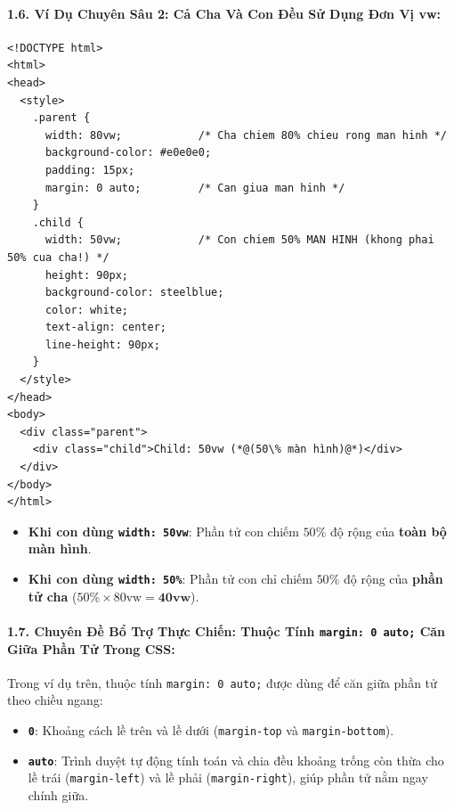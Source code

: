 \documentclass[11pt,oneside]{book}
\newcommand{\codeinline}[1]{\textcolor{accentOrange}{\texttt{#1}}}
\begin{document}
\paragraph{1.6. Ví Dụ Chuyên Sâu 2: Cả Cha Và Con Đều Sử Dụng Đơn Vị vw:}

\begin{codeWindow}
\begin{lstlisting}[language=HTML5]
<!DOCTYPE html>
<html>
<head>
  <style>
    .parent {
      width: 80vw;            /* Cha chiem 80% chieu rong man hinh */
      background-color: #e0e0e0;
      padding: 15px;
      margin: 0 auto;         /* Can giua man hinh */
    }
    .child {
      width: 50vw;            /* Con chiem 50% MAN HINH (khong phai 50% cua cha!) */
      height: 90px;
      background-color: steelblue;
      color: white;
      text-align: center;
      line-height: 90px;
    }
  </style>
</head>
<body>
  <div class="parent">
    <div class="child">Child: 50vw (*@(50\% màn hình)@*)</div>
  </div>
</body>
</html>
\end{lstlisting}
\end{codeWindow}

\begin{conceptBox}
\begin{itemize}[leftmargin=1.5em, itemsep=3pt, parsep=0pt]
    \item \textbf{Khi con dùng \codeinline{width: 50vw}}: Phần tử con chiếm $50\%$ độ rộng của \textbf{toàn bộ màn hình}.
    \item \textbf{Khi con dùng \codeinline{width: 50\%}}: Phần tử con chỉ chiếm $50\%$ độ rộng của \textbf{phần tử cha} ($50\% \times 80\text{vw} = \mathbf{40\text{vw}}$).
\end{itemize}
\end{conceptBox}

\paragraph{1.7. Chuyên Đề Bổ Trợ Thực Chiến: Thuộc Tính \codeinline{margin: 0 auto;} Căn Giữa Phần Tử Trong CSS:}

Trong ví dụ trên, thuộc tính \codeinline{margin: 0 auto;} được dùng để căn giữa phần tử theo chiều ngang:

\begin{conceptBox}
\begin{itemize}[leftmargin=1.5em, itemsep=2pt, parsep=0pt]
    \item \textbf{\codeinline{0}}: Khoảng cách lề trên và lề dưới (\codeinline{margin-top} và \codeinline{margin-bottom}).
    \item \textbf{\codeinline{auto}}: Trình duyệt tự động tính toán và chia đều khoảng trống còn thừa cho lề trái (\codeinline{margin-left}) và lề phải (\codeinline{margin-right}), giúp phần tử nằm ngay chính giữa.
\end{itemize}
\end{conceptBox}
\end{document}
